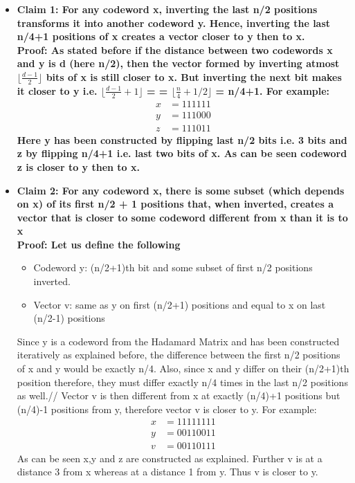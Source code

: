 \documentclass[11pt]{article}
\begin{document}
    \begin{itemize}
        \item \bf Claim 1: \normalfont For any codeword x, inverting the last n/2 positions transforms it into another codeword y. Hence, inverting the last n/4+1 positions of x creates a vector closer to y then to x.\\
        \bf Proof: \normalfont As stated before if the distance between two codewords x and y is d (here n/2), then the vector formed by inverting atmost $\lfloor\frac{d-1}{2}\rfloor$ bits of x is still closer to x. But inverting the next bit makes it closer to y i.e. $\lfloor\frac{d-1}{2}+1\rfloor$  =  = $\lfloor\frac{n}{4}+1/2\rfloor$ = n/4+1. For example:
        \begin{align*}
            x & = 111111\\
            y & = 111000\\
            z & = 111011
        \end{align*}
        Here y has been constructed by flipping last n/2 bits i.e. 3 bits and z by flipping n/4+1 i.e. last two bits of x. As can be seen codeword z is closer to y then to x.
        
        \item \bf Claim 2: For any codeword x, there is some subset (which
        depends on x) of its first n/2 + 1 positions that, when inverted,
        creates a vector that is closer to some codeword different
        from x than it is to x \normalfont\\
        \bf Proof: \normalfont Let us define the following
        \begin{itemize}
            \item Codeword y: (n/2+1)th bit and some subset of first n/2 positions inverted.
            \item Vector v: same as y on first (n/2+1) positions and equal to x on last (n/2-1) positions
        \end{itemize}
         Since y is a codeword from the Hadamard Matrix and has been constructed iteratively as explained before, the difference between the first n/2 positions of x and y would be exactly n/4. Also, since x and y differ on their (n/2+1)th position therefore, they must differ exactly n/4 times in the last n/2 positions as well.//
         Vector v is then different from x at exactly (n/4)+1 positions but (n/4)-1 positions from y, therefore vector v is closer to y. For example:
         \begin{align*}
              x & =11111111\\
              y & =00110011\\
              v & =00110111 
         \end{align*}
         As can be seen x,y and z are constructed as explained. Further v is at a distance 3 from x whereas at a distance 1 from y. Thus v is closer to y.
    \end{itemize}
\end{document}
